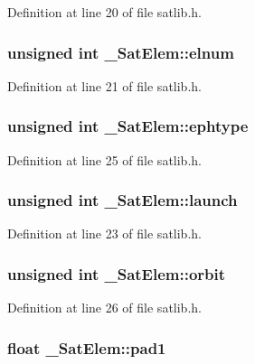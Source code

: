 Definition at line 20 of file satlib.\-h.

\hypertarget{struct___sat_elem_a8f27690ed10a4c11f8347d15cc339f03}{
\subsubsection[{elnum}]{\setlength{\rightskip}{0pt plus 5cm}unsigned int \-\_\-\-Sat\-Elem\-::elnum}}\label{struct___sat_elem_a8f27690ed10a4c11f8347d15cc339f03}


Definition at line 21 of file satlib.\-h.

\hypertarget{struct___sat_elem_a84743e8c5b4eed8213b2402e1d5ef7f4}{
\subsubsection[{ephtype}]{\setlength{\rightskip}{0pt plus 5cm}unsigned int \-\_\-\-Sat\-Elem\-::ephtype}}\label{struct___sat_elem_a84743e8c5b4eed8213b2402e1d5ef7f4}


Definition at line 25 of file satlib.\-h.

\hypertarget{struct___sat_elem_a78bf01cbb8fcb2cbd6b896b6ca88ff0c}{
\subsubsection[{launch}]{\setlength{\rightskip}{0pt plus 5cm}unsigned int \-\_\-\-Sat\-Elem\-::launch}}\label{struct___sat_elem_a78bf01cbb8fcb2cbd6b896b6ca88ff0c}


Definition at line 23 of file satlib.\-h.

\hypertarget{struct___sat_elem_a44123ee50a25e6ec959b8683803e561e}{
\subsubsection[{orbit}]{\setlength{\rightskip}{0pt plus 5cm}unsigned int \-\_\-\-Sat\-Elem\-::orbit}}\label{struct___sat_elem_a44123ee50a25e6ec959b8683803e561e}


Definition at line 26 of file satlib.\-h.

\hypertarget{struct___sat_elem_afdbc8e77fc81473ca1baa8f1f9b68f25}{
\subsubsection[{pad1}]{\setlength{\rightskip}{0pt plus 5cm}float \-\_\-\-Sat\-Elem\-::pad1}}\label{struct___sat_elem_afdbc8e77fc81473ca1baa8f1f9b68f25}


